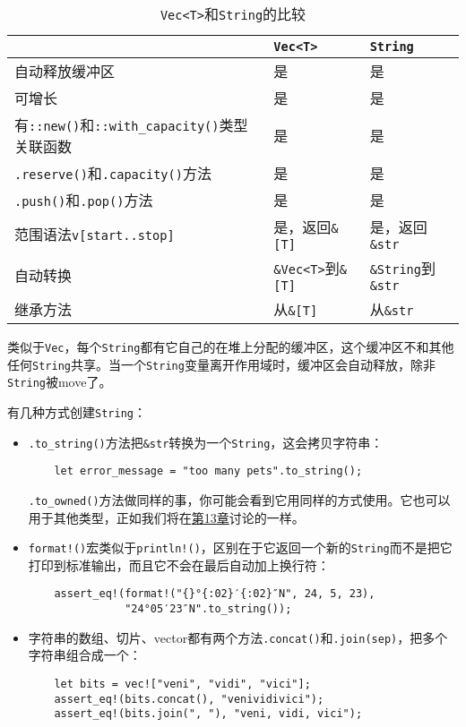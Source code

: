 \begin{table}[htbp]
    \centering
    \caption{\texttt{Vec<T>}和\texttt{String}的比较}
    \label{t3-11}
    \begin{tabular}{p{}p{}p{}}
        \hline
                    & \textbf{\texttt{Vec<T>}} & \textbf{\texttt{String}} \\
        \hline
        自动释放缓冲区 & 是 & 是 \\
        \rowcolor{tablecolor}
        可增长       & 是 & 是 \\
        有\texttt{::new()}和\texttt{::with\_capacity()}类型关联函数 & 是 & 是 \\
        \rowcolor{tablecolor}
        \texttt{.reserve()}和\texttt{.capacity()}方法 & 是 & 是 \\
        \texttt{.push()}和\texttt{.pop()}方法 & 是 & 是 \\
        \rowcolor{tablecolor}
        范围语法\texttt{v[start..stop]} & 是，返回\texttt{\&[T]} & 是，返回\texttt{\&str} \\
        自动转换      & \texttt{\&Vec<T>}到\texttt{\&[T]} & \texttt{\&String}到\texttt{\&str} \\
        \rowcolor{tablecolor}
        继承方法      & 从\texttt{\&[T]} & 从\texttt{\&str} \\
    \end{tabular}
\end{table}

类似于\texttt{Vec}，每个\texttt{String}都有它自己的在堆上分配的缓冲区，这个缓冲区不和其他任何\texttt{String}共享。当一个\texttt{String}变量离开作用域时，缓冲区会自动释放，除非\texttt{String}被move了。

有几种方式创建\texttt{String}：
\begin{itemize}
    \item \texttt{.to\_string()}方法把\texttt{\&str}转换为一个\texttt{String}，这会拷贝字符串：
    \begin{verbatim}
    let error_message = "too many pets".to_string();
    \end{verbatim}
    \texttt{.to\_owned()}方法做同样的事，你可能会看到它用同样的方式使用。它也可以用于其他类型，正如我们将在\hyperref[ch13]{第13章}讨论的一样。

    \item \texttt{format!()}宏类似于\texttt{println!()}，区别在于它返回一个新的\texttt{String}而不是把它打印到标准输出，而且它不会在最后自动加上换行符：
    \begin{verbatim}
    assert_eq!(format!("{}°{:02}′{:02}″N", 24, 5, 23),
               "24°05′23″N".to_string());
    \end{verbatim}

    \item 字符串的数组、切片、vector都有两个方法\texttt{.concat()}和\texttt{.join(sep)}，把多个字符串组合成一个：
    \begin{verbatim}
    let bits = vec!["veni", "vidi", "vici"];
    assert_eq!(bits.concat(), "venividivici");
    assert_eq!(bits.join(", "), "veni, vidi, vici");
    \end{verbatim}
\end{itemize}

